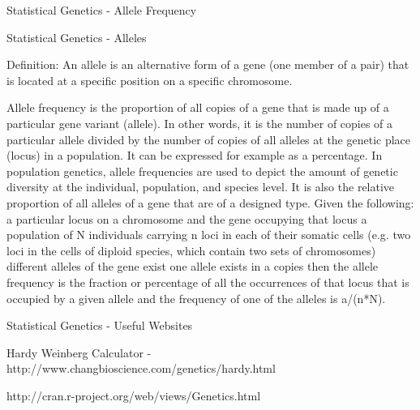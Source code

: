  
Statistical Genetics - Allele Frequency
 
 Statistical Genetics - Alleles
 
Definition: An allele is an alternative form of a gene (one member of a pair) that is located at a specific position on a specific chromosome.



Allele frequency is the proportion of all copies of a gene that is made up of a particular gene variant (allele). In other words, it is the number of copies of a particular allele divided by the number of copies of all alleles at the genetic place (locus) in a population. It can be expressed for example as a percentage. In population genetics, allele frequencies are used to depict the amount of genetic diversity at the individual, population, and species level. It is also the relative proportion of all alleles of a gene that are of a designed type.
Given the following:
a particular locus on a chromosome and the gene occupying that locus
a population of N individuals carrying n loci in each of their somatic cells (e.g. two loci in the cells of diploid species, which contain two sets of chromosomes)
different alleles of the gene exist
one allele exists in a copies
then the allele frequency is the fraction or percentage of all the occurrences of that locus that is occupied by a given allele and the frequency of one of the alleles is a/(n*N).

Statistical Genetics - Useful Websites
 
 
Hardy Weinberg Calculator  - http://www.changbioscience.com/genetics/hardy.html

http://cran.r-project.org/web/views/Genetics.html
